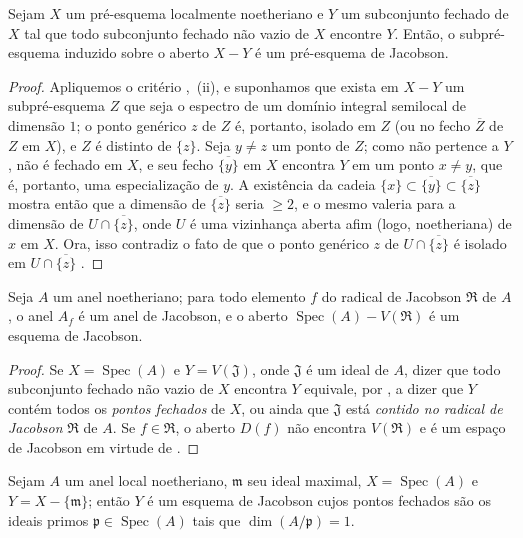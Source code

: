 \begin{proposition}[10.5.7]
\label{IV.10.5.7}
Sejam $X$ um pré-esquema localmente noetheriano e $Y$ um subconjunto fechado de $X$ tal que todo subconjunto fechado não vazio de $X$ encontre $Y$.
Então, o subpré-esquema induzido sobre o aberto $X-Y$ é um pré-esquema de Jacobson.
\end{proposition}

\begin{proof}
Apliquemos o critério ,~(ii), e suponhamos que exista em $X-Y$ um subpré-esquema $Z$ que seja o espectro de um domínio integral semilocal de dimensão $1$; o ponto genérico $z$ de $Z$ é, portanto, isolado em $Z$ (ou no fecho $\overline{Z}$ de $Z$ em $X$), e $Z$ é distinto de $\{z\}$.
Seja $y\neq z$ um ponto de $Z$; como não pertence a $Y$, não é fechado em $X$, e seu fecho $\overline{\{y\}}$ em $X$ encontra $Y$ em um ponto $x\neq y$, que é, portanto, uma especialização de $y$.
A existência da cadeia $\{x\}\subset\overline{\{y\}}\subset\overline{\{z\}}$ mostra então que a dimensão de $\overline{\{z\}}$ seria $\geq2$, e o mesmo valeria para a dimensão de $U\cap\overline{\{z\}}$, onde $U$ é uma vizinhança aberta afim (logo, noetheriana) de $x$ em $X$.
Ora, isso contradiz o fato de que o ponto genérico $z$ de $U\cap\overline{\{z\}}$ é isolado em $U\cap\overline{\{z\}}$ .
\end{proof}

\begin{corollary}[10.5.8]
\label{IV.10.5.8}
Seja $A$ um anel noetheriano; para todo elemento $f$ do radical de Jacobson $\mathfrak{R}$ de $A$, o anel $A_f$ é um anel de Jacobson, e o aberto $\operatorname{Spec}(A)-V(\mathfrak{R})$ é um esquema de Jacobson.
\end{corollary}

\begin{proof}
Se $X=\operatorname{Spec}(A)$ e $Y=V(\mathfrak{J})$, onde $\mathfrak{J}$ é um ideal de $A$, dizer que todo subconjunto fechado não vazio de $X$ encontra $Y$ equivale, por , a dizer que $Y$ contém todos os \emph{pontos fechados} de $X$, ou ainda que $\mathfrak{J}$ está \emph{contido no radical de Jacobson} $\mathfrak{R}$ de $A$.
Se $f\in\mathfrak{R}$, o aberto $D(f)$ não encontra $V(\mathfrak{R})$ e é um espaço de Jacobson em virtude de .
\end{proof}

\begin{corollary}[10.5.9]
\label{IV.10.5.9}
Sejam $A$ um anel local noetheriano, $\mathfrak{m}$ seu ideal maximal, $X=\operatorname{Spec}(A)$ e $Y=X-\{\mathfrak{m}\}$; então $Y$ é um esquema de Jacobson cujos pontos fechados são os ideais primos $\mathfrak{p}\in\operatorname{Spec}(A)$ tais que $\dim(A/\mathfrak{p})=1$.
\end{corollary}

